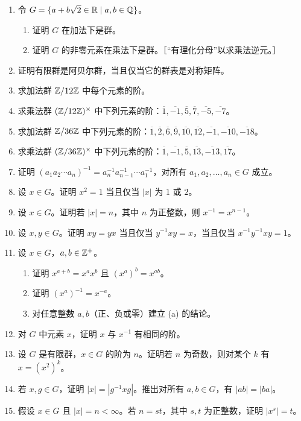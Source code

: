 \begin{enumerate}[label=\arabic*.]
  \item 令 $G=\{a+b\sqrt2\in\mathbb{R}\mid a,b\in\mathbb{Q}\}$。
  \begin{enumerate}[label=(\alph*)]
    \item 证明 $G$ 在加法下是群。
    \item 证明 $G$ 的非零元素在乘法下是群。［“有理化分母”以求乘法逆元。］
  \end{enumerate}
  \item 证明有限群是阿贝尔群，当且仅当它的群表是对称矩阵。
  \item 求加法群 $\mathbb{Z}/12\mathbb{Z}$ 中每个元素的阶。
  \item 求乘法群 $(\mathbb{Z}/12\mathbb{Z})^\times$ 中下列元素的阶：$\overline{1},\overline{-1},\overline{5},\overline{7},\overline{-5},\overline{-7}$。
  \item 求加法群 $\mathbb{Z}/36\mathbb{Z}$ 中下列元素的阶：$\overline{1},\overline{2},\overline{6},\overline{9},\overline{10},\overline{12},\overline{-1},\overline{-10},\overline{-18}$。
  \item 求乘法群 $(\mathbb{Z}/36\mathbb{Z})^\times$ 中下列元素的阶：$\overline{1},\overline{-1},\overline{5},\overline{13},\overline{-13},\overline{17}$。
  \item 证明 $(a_1a_2\cdots a_n)^{-1}=a_n^{-1}a_{n-1}^{-1}\cdots a_1^{-1}$，对所有 $a_1,a_2,\ldots,a_n\in G$ 成立。
  \item 设 $x\in G$。证明 $x^2=1$ 当且仅当 $|x|$ 为 $1$ 或 $2$。
  \item 设 $x\in G$。证明若 $|x|=n$，其中 $n$ 为正整数，则 $x^{-1}=x^{n-1}$。
  \item 设 $x,y\in G$。证明 $xy=yx$ 当且仅当 $y^{-1}xy=x$，当且仅当 $x^{-1}y^{-1}xy=1$。
  \item 设 $x\in G$，$a,b\in\mathbb{Z}^+$。
  \begin{enumerate}[label=(\alph*)]
    \item 证明 $x^{a+b}=x^ax^b$ 且 $(x^a)^b=x^{ab}$。
    \item 证明 $(x^a)^{-1}=x^{-a}$。
    \item 对任意整数 $a,b$（正、负或零）建立 (a) 的结论。
  \end{enumerate}
  \item 对 $G$ 中元素 $x$，证明 $x$ 与 $x^{-1}$ 有相同的阶。
  \item 设 $G$ 是有限群，$x\in G$ 的阶为 $n$。证明若 $n$ 为奇数，则对某个 $k$ 有 $x=(x^2)^k$。
  \item 若 $x,g\in G$，证明 $|x|=|g^{-1}xg|$。推出对所有 $a,b\in G$，有 $|ab|=|ba|$。
  \item 假设 $x\in G$ 且 $|x|=n<\infty$。若 $n=st$，其中 $s,t$ 为正整数，证明 $|x^s|=t$。

\end{enumerate}
